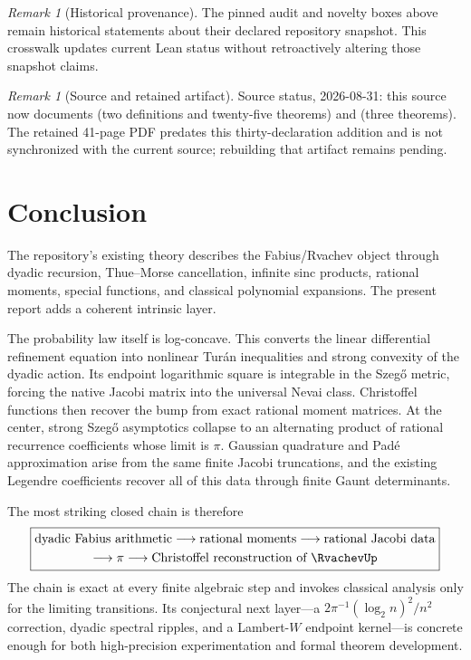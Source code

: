 \documentclass[11pt,oneside]{article}
\theoremstyle{definition}
\theoremstyle{remark}
\newtheorem{remark}[theorem]{Remark}
\numberwithin{equation}{section}
\begin{document}
\begin{remark}[Historical provenance]
The pinned audit and novelty boxes above remain historical statements about their
declared repository snapshot.  This crosswalk updates current Lean status without
retroactively altering those snapshot claims.
\end{remark}

\begin{remark}[Source and retained artifact]
Source status, 2026-08-31: this source now documents
 (two definitions and twenty-five theorems)
and  (three theorems).  The retained
41-page PDF predates this thirty-declaration addition and is not synchronized
with the current source; rebuilding that artifact remains pending.
\end{remark}

\section{Conclusion}
\label{sec:conclusion}

The repository's existing theory describes the Fabius/Rvachev object through
dyadic recursion, Thue--Morse cancellation, infinite sinc products, rational
moments, special functions, and classical polynomial expansions.  The present
report adds a coherent intrinsic layer.

The probability law itself is log-concave.  This converts the linear
differential refinement equation into nonlinear Tur\'an inequalities and
strong convexity of the dyadic action.  Its endpoint logarithmic square is
integrable in the Szeg\H{o} metric, forcing the native Jacobi matrix into the
universal Nevai class.  Christoffel functions then recover the bump from exact
rational moment matrices.  At the center, strong Szeg\H{o} asymptotics collapse
to an alternating product of rational recurrence coefficients whose limit is
$\pi$.  Gaussian quadrature and Pad\'e approximation arise from the same
finite Jacobi truncations, and the existing Legendre coefficients recover all
of this data through finite Gaunt determinants.

The most striking closed chain is therefore
\begin{equation}
 \boxed{\begin{gathered}
 \text{dyadic Fabius arithmetic}
 \longrightarrow \text{rational moments}
 \longrightarrow \text{rational Jacobi data}\\
 \longrightarrow \pi
 \longrightarrow \text{Christoffel reconstruction of }\RvachevUp
 \end{gathered}}
 \label{eq:final-chain}
\end{equation}
The chain is exact at every finite algebraic step and invokes classical
analysis only for the limiting transitions.  Its conjectural next layer---a
$2\pi^{-1}(\log_2n)^2/n^2$ correction, dyadic spectral ripples, and a
Lambert-$W$ endpoint kernel---is concrete enough for both high-precision
experimentation and formal theorem development.
\end{document}
